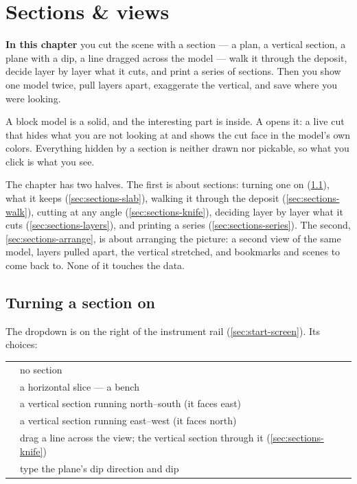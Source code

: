 \chapter{Sections \& views}\label{ch:sections}
\begin{goals}
\textbf{In this chapter} you cut the scene with a section — a plan, a vertical section, a plane with a dip, a line dragged across the model — walk it through the deposit, decide layer by layer what it cuts, and print a series of sections. Then you show one model twice, pull layers apart, exaggerate the vertical, and save where you were looking.
\end{goals}

A block model is a solid, and the interesting part is inside. A  opens it: a live cut that hides what you are not looking at and shows the cut face in the model's own colors. Everything hidden by a section is neither drawn nor pickable, so what you click is what you see.

The chapter has two halves. The first is about sections: turning one on (\cref{sec:sections-on}), what it keeps (\cref{sec:sections-slab}), walking it through the deposit (\cref{sec:sections-walk}), cutting at any angle (\cref{sec:sections-knife}), deciding layer by layer what it cuts (\cref{sec:sections-layers}), and printing a series (\cref{sec:sections-series}). The second, \cref{sec:sections-arrange}, is about arranging the picture: a second view of the same model, layers pulled apart, the vertical stretched, and bookmarks and scenes to come back to. None of it touches the data.

\section{Turning a section on}\label{sec:sections-on}
The  dropdown is on the right of the instrument rail (\cref{sec:start-screen}). Its choices:

\begin{center}
\begin{tabularx}{\linewidth}{@{}lL@{}}\toprule
{} & no section \\
 & a horizontal slice — a bench \\
 & a vertical section running north–south (it faces east) \\
 & a vertical section running east–west (it faces north) \\
 & drag a line across the view; the vertical section through it (\cref{sec:sections-knife}) \\
 & type the plane's dip direction and dip \\ \bottomrule
\end{tabularx}
\end{center}

